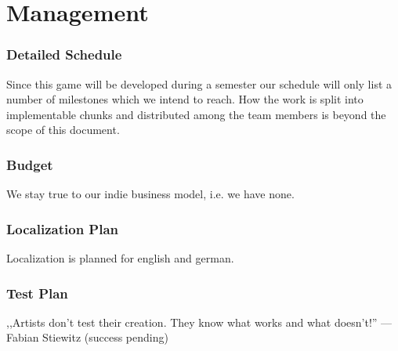 \part{Management}
\section{Detailed Schedule} %
Since this game will be developed during a semester our schedule will only list
a number of milestones which we intend to reach. How the work is split into implementable
chunks and distributed among the team members is beyond the scope of this document.
\section{Budget}
We stay true to our indie business model, i.e. we have none.
\section{Localization Plan} %
Localization is planned for english and german.
\section{Test Plan} %
,,Artists don't test their creation. They know what works and what doesn't!'' --- Fabian Stiewitz (success pending)
